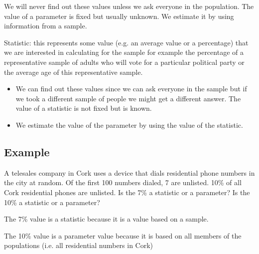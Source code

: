 ﻿\documentclass[]{report}
\begin{document}



We will never find out these values unless we ask everyone in the population. The value of a parameter is fixed but usually unknown. We estimate it by using information from a sample. 

Statistic: this represents some value (e.g. an average value or a percentage) that we are interested in calculating for the sample for example the percentage of a representative sample of adults who will vote for a particular political party or the average age of this representative sample. 


\begin{itemize}
\item We can find out these values since we can ask everyone in the sample but if we took a different sample of people we might get a different answer. The value of a statistic is not fixed but is known. 

\item We estimate the value of the parameter by using the value of the statistic.
\end{itemize}


\subsection{Example}

A telesales company in Cork uses a device that dials residential phone numbers in the city at random. Of the first 100 numbers dialed, 7 are unlisted.  10\% of all Cork residential phones are unlisted. Is the 7\% a statistic or a parameter? Is the 10\% a statistic or a parameter?






The 7\% value is a statistic because it is a value based on a sample.

The 10\% value is a parameter value because it is based on all members of the populations  (i.e. all residential numbers in Cork)
\end{document}
